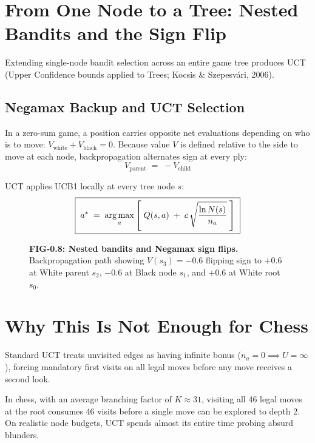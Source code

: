 \section{From One Node to a Tree: Nested Bandits and the Sign Flip}
\label{sec:0_7}

Extending single-node bandit selection across an entire game tree produces UCT (Upper Confidence bounds applied to Trees; Kocsis \& Szepesv\'ari, 2006).

\subsection{Negamax Backup and UCT Selection}

In a zero-sum game, a position carries opposite net evaluations depending on who is to move: $V_{\text{white}} + V_{\text{black}} = 0$. Because value $V$ is defined relative to the side to move at each node, backpropagation alternates sign at every ply:
\begin{equation}
\label{eq:E8}
\boxed{\;V_{\text{parent}} \;=\; -V_{\text{child}}\;}
\end{equation}

UCT applies UCB1 locally at every tree node $s$:
\begin{equation}
\label{eq:E9}
\boxed{\;a^* \;=\; \operatorname*{arg\,max}_{a} \left[\; Q(s,a) \;+\; c\,\sqrt{\frac{\ln N(s)}{n_a}} \;\right]\;}
\end{equation}

\begin{figure}[htbp]
\centering

\caption{\textbf{FIG-0.8: Nested bandits and Negamax sign flips.} Backpropagation path showing $V(s_3) = -0.6$ flipping sign to $+0.6$ at White parent $s_2$, $-0.6$ at Black node $s_1$, and $+0.6$ at White root $s_0$.}
\label{fig:0_8}
\end{figure}

\section{Why This Is Not Enough for Chess}
\label{sec:0_8}

Standard UCT treats unvisited edges as having infinite bonus ($n_a = 0 \implies U = \infty$), forcing mandatory first visits on all legal moves before any move receives a second look.

In chess, with an average branching factor of $K \approx 31$, visiting all 46 legal moves at the root consumes 46 visits before a single move can be explored to depth 2. On realistic node budgets, UCT spends almost its entire time probing absurd blunders.

